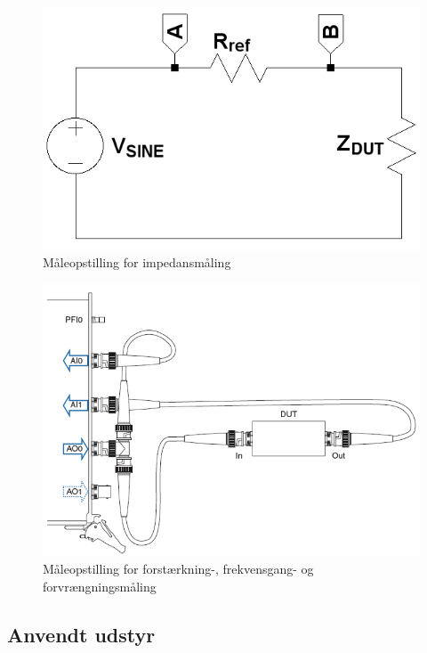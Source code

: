\begin{figure}[h]
\centering
\includegraphics[scale=0.25]{maalerapporter/forforstaerker/impedansopstilling-forforstaerker.png}
\caption{Måleopstilling for impedansmåling}
\label{fig:maaleop-imp}
\end{figure}

\begin{figure}[h]
\centering
\includegraphics[scale=0.3]{maalerapporter/forforstaerker/maaleopstilling-thd-forforstaerker.png}
\caption{Måleopstilling for forstærkning-, frekvensgang- og forvrængningsmåling \cite{maaling-mm5}}
\label{fig:maaleop-thd}
\end{figure}

\subsection*{Anvendt udstyr}

